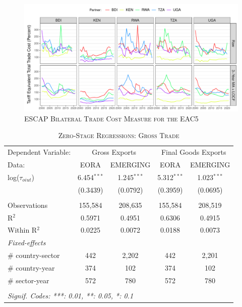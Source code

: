 \documentclass[a4paper]{article}
\begin{document}
\begin{figure}[h!] \vspace{-0.5cm}
\centering
\caption{\label{fig:ESCAP_EAC}\textsc{ESCAP Bilateral Trade Cost Measure for the EAC5}}
\includegraphics[width=1\textwidth]{"Figures/ESCAP_EAC5_Trade_Costs.pdf"} \vspace{-1cm}
\end{figure}
\FloatBarrier


\begin{table}[h!]
   \caption{\label{tab:ZS_GT_FULL} \textsc{Zero-Stage Regressions: Gross Trade}}
   \centering
   \begin{tabular}{lcccc}
      \tabularnewline \toprule
      Dependent Variable: & \multicolumn{2}{c}{Gross Exports} & \multicolumn{2}{c}{Final Goods Exports} \\ \cmidrule(lr){2-5}
      Data:                               & EORA           & EMERGING        & EORA           & EMERGING \\   
      \midrule
      log($\tau_{oiut}$)      & 6.454$^{***}$ & 1.245$^{***}$ & 5.312$^{***}$ & 1.023$^{***}$\\  
                                   & (0.3439)      & (0.0792)    & (0.3959)      & (0.0695)\\ \\   
      Observations                 & 155,584       & 208,635       & 155,584       & 208,519\\  
      R$^2$                        & 0.5971        & 0.4951        & 0.6306        & 0.4915\\  
      Within R$^2$                 & 0.0225        & 0.0072        & 0.0188        & 0.0073\\     
      \midrule
      \emph{Fixed-effects}  \\
     \# country-sector            & 442           & 2,202         & 442           & 2,201\\  
      \# country-year              & 374           & 102           & 374           & 102\\  
      \# sector-year               & 572           & 780           & 572           & 780\\  
      \bottomrule \\ [-0.9em]
      \multicolumn{5}{l}{\emph{Signif. Codes: ***: 0.01, **: 0.05, *: 0.1}}\\
   \end{tabular}
   \vspace{-0.5cm}
\end{table}
\FloatBarrier
\end{document}
